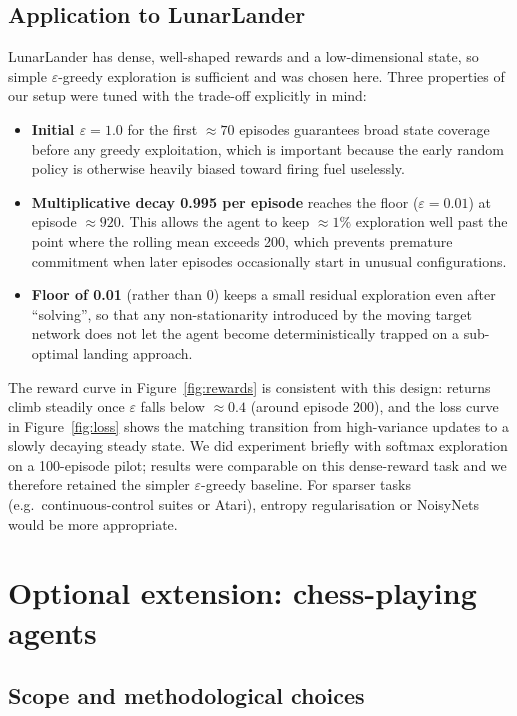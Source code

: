 \documentclass[11pt,a4paper]{article}
\begin{document}
\subsection{Application to LunarLander}
LunarLander has dense, well-shaped rewards and a low-dimensional state,
so simple $\varepsilon$-greedy exploration is sufficient and was chosen
here. Three properties of our setup were tuned with the trade-off
explicitly in mind:
\begin{itemize}
  \item \textbf{Initial $\varepsilon = 1.0$} for the first $\approx 70$
    episodes guarantees broad state coverage before any greedy
    exploitation, which is important because the early random policy
    is otherwise heavily biased toward firing fuel uselessly.
  \item \textbf{Multiplicative decay 0.995 per episode} reaches the
    floor ($\varepsilon = 0.01$) at episode $\approx 920$. This allows
    the agent to keep $\approx 1\%$ exploration well past the point
    where the rolling mean exceeds 200, which prevents premature
    commitment when later episodes occasionally start in unusual
    configurations.
  \item \textbf{Floor of 0.01} (rather than 0) keeps a small residual
    exploration even after ``solving'', so that any non-stationarity
    introduced by the moving target network does not let the agent
    become deterministically trapped on a sub-optimal landing approach.
\end{itemize}
The reward curve in Figure~\ref{fig:rewards} is consistent with this
design: returns climb steadily once $\varepsilon$ falls below
$\approx 0.4$ (around episode 200), and the loss curve in
Figure~\ref{fig:loss} shows the matching transition from high-variance
updates to a slowly decaying steady state. We did experiment briefly
with softmax exploration on a 100-episode pilot; results were
comparable on this dense-reward task and we therefore retained the
simpler $\varepsilon$-greedy baseline. For sparser tasks (e.g.\
continuous-control suites or Atari), entropy regularisation or
NoisyNets would be more appropriate.

\newpage
\section{Optional extension: chess-playing agents}

\subsection{Scope and methodological choices}
\end{document}
